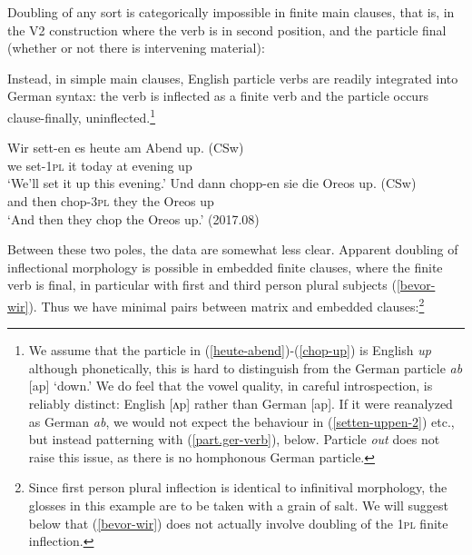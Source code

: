 \documentclass[output=paper]{langscibook}
\begin{document}
Doubling of any sort is categorically impossible in finite main clauses, that is, in the V2 construction where the verb is in second position, and the particle final (whether or not there is intervening material): 

\ea
{}
\z 
\z 

Instead, in simple main clauses, English particle verbs are readily integrated into German syntax: the verb is inflected as a finite verb and the particle occurs clause-finally, uninflected.\footnote{We assume that the particle in (\ref{heute-abend})-(\ref{chop-up}) is English \textit{up} although phonetically, this is hard to distinguish from the German particle \textit{ab} {[}ap{]} `down.' We do feel that the vowel quality, in careful introspection, is reliably distinct: English {[}ʌp{]} rather than German {[}ap{]}. If it were reanalyzed as German \textit{ab}, we would not expect the behaviour in (\ref{setten-uppen-2}) etc., but instead patterning with (\ref{part.ger-verb}), below. Particle \textit{out} does not raise this issue, as there is no homphonous German particle.} 

\ea\label{v2-verb-particle}
\ea\label{heute-abend}{\gll Wir sett-en es heute am Abend up. (CSw)\\
we set-\textsc{1pl} it today at evening up\\
\glt `We'll set it up this evening.'}
\ex\label{chop-up}{\gll Und dann chopp-en sie die Oreos up. (CSw)\\
and then chop-\textsc{3pl} they the Oreos up\\
\glt `And then they chop the Oreos up.' (2017.08)}
\z\z 

Between these two poles, the data are somewhat less clear. Apparent doubling of inflectional morphology is possible in embedded finite clauses, where the finite verb is final, in particular with first and third person plural subjects (\ref{bevor-wir}). Thus we have minimal pairs between matrix and embedded clauses:\footnote{Since first person plural inflection is identical to infinitival morphology, the glosses in this example are to be taken with a grain of salt. We will suggest below that (\ref{bevor-wir}) does not actually involve doubling of the \textsc{1pl} finite inflection.}
\end{document}
